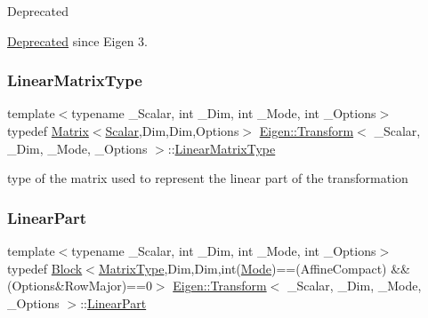 \begin{DoxyRefDesc}{Deprecated}
\item[\mbox{\hyperlink{deprecated__deprecated000035}{Deprecated}}]since Eigen 3. \end{DoxyRefDesc}
\mbox{\label{class_eigen_1_1_transform_a48138c0370e55371b95946c90d69e25c}} 
\subsubsection{\texorpdfstring{LinearMatrixType}{LinearMatrixType}}
{\footnotesize\ttfamily template$<$typename \+\_\+\+Scalar, int \+\_\+\+Dim, int \+\_\+\+Mode, int \+\_\+\+Options$>$ \\
typedef \mbox{\hyperlink{class_eigen_1_1_matrix}{Matrix}}$<$\mbox{\hyperlink{class_eigen_1_1_transform_a4e69ced9d651745b8ed4eda46f41795d}{Scalar}},Dim,Dim,Options$>$ \mbox{\hyperlink{class_eigen_1_1_transform}{Eigen\+::\+Transform}}$<$ \+\_\+\+Scalar, \+\_\+\+Dim, \+\_\+\+Mode, \+\_\+\+Options $>$\+::\mbox{\hyperlink{class_eigen_1_1_transform_a48138c0370e55371b95946c90d69e25c}{Linear\+Matrix\+Type}}}

type of the matrix used to represent the linear part of the transformation \mbox{\label{class_eigen_1_1_transform_a1441ef7d89d1f4cebd061db33b993cf2}} 
\subsubsection{\texorpdfstring{LinearPart}{LinearPart}}
{\footnotesize\ttfamily template$<$typename \+\_\+\+Scalar, int \+\_\+\+Dim, int \+\_\+\+Mode, int \+\_\+\+Options$>$ \\
typedef \mbox{\hyperlink{class_eigen_1_1_block}{Block}}$<$\mbox{\hyperlink{class_eigen_1_1_transform_a30f72ba46abc2bb3c7fa919c1078fc9c}{Matrix\+Type}},Dim,Dim,int(\mbox{\hyperlink{struct_mode}{Mode}})==(Affine\+Compact) \&\& (Options\&Row\+Major)==0$>$ \mbox{\hyperlink{class_eigen_1_1_transform}{Eigen\+::\+Transform}}$<$ \+\_\+\+Scalar, \+\_\+\+Dim, \+\_\+\+Mode, \+\_\+\+Options $>$\+::\mbox{\hyperlink{class_eigen_1_1_transform_a1441ef7d89d1f4cebd061db33b993cf2}{Linear\+Part}}}

